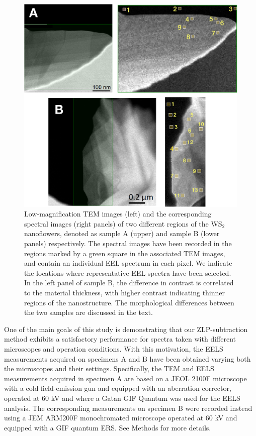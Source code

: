 \begin{figure}[t]
\begin{centering}
  \includegraphics[width=0.92\linewidth]{plots/Spectra_location.pdf}
  \caption{Low-magnification TEM images (left) and the corresponding
    spectral images (right panels) of two different regions of
    the WS$_2$ nanoflowers, denoted as sample A (upper) and sample B (lower panels) respectively.
    The spectral images have been recorded in the regions marked by a green square
    in the associated TEM images, and contain an individual EEL spectrum in each pixel.
    We indicate the locations where representative
    EEL spectra have been selected. 
    In the left panel of sample B, the difference in contrast is correlated to the material
    thickness, with higher contrast indicating thinner regions of the nanostructure.
    The morphological differences between the two samples are discussed in the text.
  }
\label{fig:ws2positions}
\end{centering}
\end{figure}

One of the main goals of this study is demonstrating that our ZLP-subtraction method exhibits
a satisfactory performance for spectra taken with different microscopes and operation conditions.
%
With this motivation, the EELS measurements acquired on specimens A and B have
been obtained varying both the microscopes and their settings.
%
Specifically, the TEM and EELS measurements acquired in specimen A  are based on a JEOL 2100F
microscope with a cold field-emission
gun and equipped with an aberration corrector,
operated at 60 kV and where a Gatan GIF Quantum was used for
the EELS analysis.
%
The corresponding measurements on specimen B  were recorded instead
using a JEM ARM200F monochromated microscope operated at 60 kV and equipped with a GIF quantum ERS.
%
See Methods for more details.

